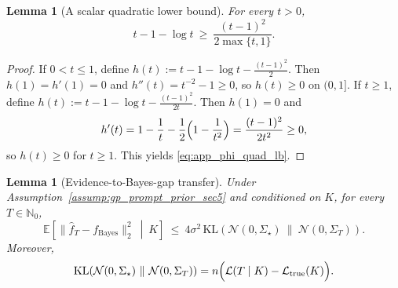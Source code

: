 \documentclass{article}
\theoremstyle{plain}
\newtheorem{lemma}[theorem]{Lemma}
\theoremstyle{definition}
\theoremstyle{remark}
\begin{document}
\begin{lemma}[A scalar quadratic lower bound]
\label{lem:app_phi_quad_lb}
For every $t>0$,
\begin{equation}
t-1-\log t\ \ge\ \frac{(t-1)^2}{2\max\{t,1\}}.
\label{eq:app_phi_quad_lb}
\end{equation}
\end{lemma}

\begin{proof}
If $0<t\le 1$, define $h(t):=t-1-\log t-\frac{(t-1)^2}{2}$. Then $h(1)=h'(1)=0$ and
$h''(t)=t^{-2}-1\ge 0$, so $h(t)\ge 0$ on $(0,1]$.
If $t\ge 1$, define $h(t):=t-1-\log t-\frac{(t-1)^2}{2t}$. Then $h(1)=0$ and
\[
h'(t)=1-\frac1t-\frac12\Bigl(1-\frac1{t^2}\Bigr)=\frac{(t-1)^2}{2t^2}\ge 0,
\]
so $h(t)\ge 0$ for $t\ge 1$. This yields \eqref{eq:app_phi_quad_lb}.
\end{proof}

\begin{lemma}[Evidence-to-Bayes-gap transfer]
\label{thm:app_kl_controls_gap}
Under Assumption~\ref{assump:gp_prompt_prior_sec5} and conditioned on $K$, for every $T\in\mathbb N_0$,
\begin{equation}
\mathbb E\!\left[\|\hat f_T-f_{\mathrm{Bayes}}\|_2^2\ \middle|\ K\right]
\ \le\
4\sigma^2\,
\mathrm{KL}\!\left(\mathcal N(0,\Sigma_\star)\ \|\ \mathcal N(0,\Sigma_T)\right).
\label{eq:app_gap_le_kl}
\end{equation}
Moreover,
\begin{equation}
\mathrm{KL}\!\left(\mathcal N(0,\Sigma_\star)\ \|\ \mathcal N(0,\Sigma_T)\right)
=
n\Bigl(\mathcal L(T\mid K)-\mathcal L_{\mathrm{true}}(K)\Bigr).
\label{eq:app_kl_equals_Lgap}
\end{equation}
\end{lemma}
\end{document}
